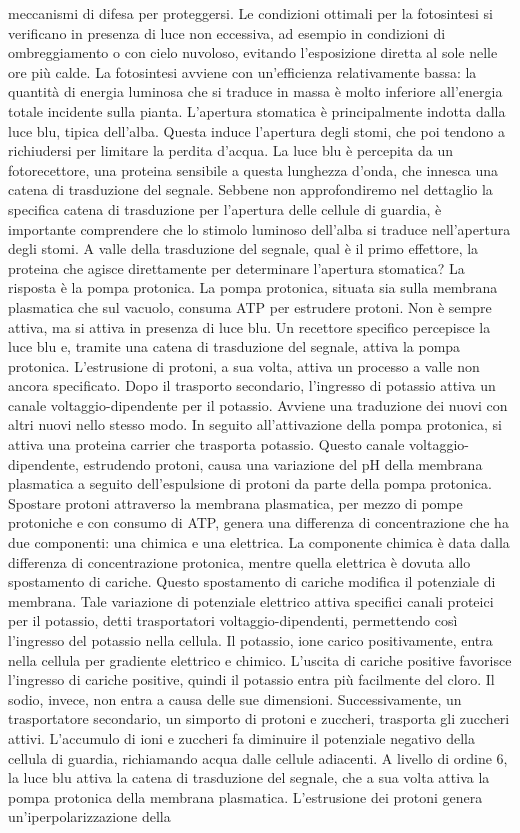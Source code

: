 \documentclass[11pt, a4paper]{article}
\begin{document}
\begin{spacing}{1.15}
meccanismi di difesa per proteggersi. Le condizioni ottimali per la fotosintesi si verificano in presenza di luce non eccessiva, ad esempio in condizioni di ombreggiamento o con cielo nuvoloso, evitando l'esposizione diretta al sole nelle ore più calde. La fotosintesi avviene con un'efficienza relativamente bassa: la quantità di energia luminosa che si traduce in massa è molto inferiore all'energia totale incidente sulla pianta. L'apertura stomatica è principalmente indotta dalla luce blu, tipica dell'alba.  Questa induce l'apertura degli stomi, che poi tendono a richiudersi per limitare la perdita d'acqua. La luce blu è percepita da un fotorecettore, una proteina sensibile a questa lunghezza d'onda, che innesca una catena di trasduzione del segnale. Sebbene non approfondiremo nel dettaglio la specifica catena di trasduzione per l'apertura delle cellule di guardia, è importante comprendere che lo stimolo luminoso dell'alba si traduce nell'apertura degli stomi.  A valle della trasduzione del segnale, qual è il primo effettore, la proteina che agisce direttamente per determinare l'apertura stomatica? La risposta è la pompa protonica. La pompa protonica, situata sia sulla membrana plasmatica che sul vacuolo, consuma ATP per estrudere protoni. Non è sempre attiva, ma si attiva in presenza di luce blu. Un recettore specifico percepisce la luce blu e, tramite una catena di trasduzione del segnale, attiva la pompa protonica. L'estrusione di protoni, a sua volta, attiva un processo a valle non ancora specificato. Dopo il trasporto secondario, l'ingresso di potassio attiva un canale voltaggio-dipendente per il potassio. Avviene una traduzione dei nuovi con altri nuovi nello stesso modo. In seguito all'attivazione della pompa protonica, si attiva una proteina carrier che trasporta potassio. Questo canale voltaggio-dipendente, estrudendo protoni, causa una variazione del pH della membrana plasmatica a seguito dell'espulsione di protoni da parte della pompa protonica. Spostare protoni attraverso la membrana plasmatica, per mezzo di pompe protoniche e con consumo di ATP, genera una differenza di concentrazione che ha due componenti: una chimica e una elettrica. La componente chimica è data dalla differenza di concentrazione protonica, mentre quella elettrica è dovuta allo spostamento di cariche. Questo spostamento di cariche modifica il potenziale di membrana. Tale variazione di potenziale elettrico attiva specifici canali proteici per il potassio, detti trasportatori voltaggio-dipendenti, permettendo così l'ingresso del potassio nella cellula. Il potassio, ione carico positivamente, entra nella cellula per gradiente elettrico e chimico. L'uscita di cariche positive favorisce l'ingresso di cariche positive, quindi il potassio entra più facilmente del cloro. Il sodio, invece, non entra a causa delle sue dimensioni. Successivamente, un trasportatore secondario, un simporto di protoni e zuccheri, trasporta gli zuccheri attivi. L'accumulo di ioni e zuccheri fa diminuire il potenziale negativo della cellula di guardia, richiamando acqua dalle cellule adiacenti. A livello di ordine 6, la luce blu attiva la catena di trasduzione del segnale, che a sua volta attiva la pompa protonica della membrana plasmatica. L'estrusione dei protoni genera un'iperpolarizzazione della 
\end{spacing}
\end{document}
